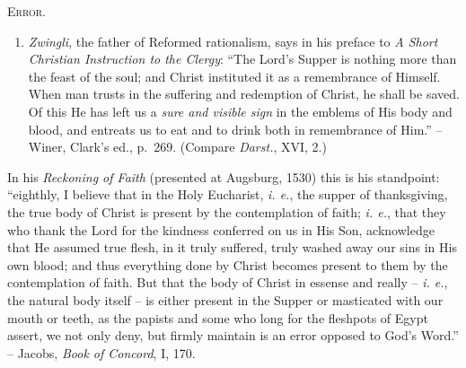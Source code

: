 \documentclass[
]{book}
\providecommand{\tightlist}{%
  \setlength{\itemsep}{0pt}\setlength{\parskip}{0pt}}
\begin{document}
\begin{center}
\textsc{Error.}
\end{center}

\begin{enumerate}
\def\labelenumi{\arabic{enumi}.}
\tightlist
\item
  \emph{Zwingli}, the father of Reformed rationalism, says in his preface to \emph{A Short Christian Instruction to the Clergy}: ``The Lord's Supper is nothing more than the feast of the soul; and Christ instituted it as a remembrance of Himself. When man trusts in the suffering and redemption of Christ, he shall be saved. Of this He has left us a \emph{sure and visible sign} in the emblems of His body and blood, and entreats us to eat and to drink both in remembrance of Him.'' -- Winer, Clark's ed., p.~269. (Compare \emph{Darst.}, XVI, 2.)
\end{enumerate}

In his \emph{Reckoning of Faith} (presented at Augsburg, 1530) this is his standpoint: ``eighthly, I believe that in the Holy Eucharist, \emph{i. e.}, the supper of thanksgiving, the true body of Christ is present by the contemplation of faith; \emph{i. e.}, that they who thank the Lord for the kindness conferred on us in His Son, acknowledge that He assumed true flesh, in it truly suffered, truly washed away our sins in His own blood; and thus everything done by Christ becomes present to them by the contemplation of faith. But that the body of Christ in essense and really -- \emph{i. e.}, the natural body itself -- is either present in the Supper or masticated with our mouth or teeth, as the papists and some who long for the fleshpots of Egypt assert, we not only deny, but firmly maintain is an error opposed to God's Word.'' -- Jacobs, \emph{Book of Concord}, I, 170.
\end{document}
